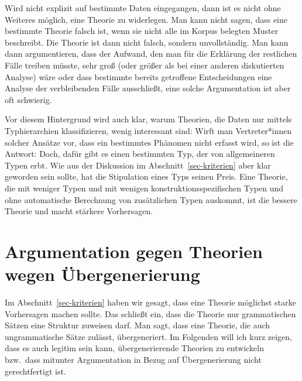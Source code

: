 Wird nicht explizit auf bestimmte Daten eingegangen, dann ist es nicht ohne Weiteres möglich,
eine Theorie zu widerlegen. Man kann \zb nicht sagen, dass eine bestimmte Theorie %
falsch ist, wenn sie nicht alle im Korpus belegten Muster %
beschreibt. Die Theorie ist dann nicht falsch, sondern unvollständig. Man kann dann argumentieren,
dass der Aufwand, den man für die Erklärung der restlichen Fälle treiben müsste, sehr groß (oder größer als bei einer
anderen diskutierten Analyse) wäre oder dass bestimmte bereits getroffene Entscheidungen eine Analyse der verbleibenden Fälle ausschließt,
eine solche Argumentation ist aber oft schwierig. 

Vor diesem Hintergrund wird auch klar, warum Theorien, die Daten nur mittels Typhierarchien klassifizieren,
wenig interessant sind: Wirft man Vertreter*innen solcher Ansätze vor, dass ein bestimmtes Phänomen
nicht erfasst wird, so ist die Antwort: Doch, dafür gibt es einen bestimmten Typ, der von allgemeineren
Typen erbt. Wie aus der Diskussion im Abschnitt~\ref{sec-kriterien} aber klar geworden sein sollte,
hat die Stipulation eines Typs seinen Preis. Eine Theorie, die mit weniger Typen und mit wenigen
konstruktionsspezifischen Typen und ohne automatische Berechnung von zusätzlichen Typen
auskommt, ist die bessere Theorie und macht stärkere Vorhersagen.






\section{Argumentation gegen Theorien wegen Übergenerierung}

Im Abschnitt~\ref{sec-kriterien} haben wir gesagt, dass eine Theorie möglichst starke Vorhersagen
machen sollte. Das schließt ein, dass die Theorie nur grammatischen Sätzen eine Struktur zuweisen
darf. Man sagt, dass eine Theorie, die auch ungrammatische Sätze zulässt, übergeneriert. Im Folgenden
will ich kurz zeigen, dass es auch legitim sein kann, übergenerierende Theorien zu entwickeln bzw.\
dass mitunter Argumentation in Bezug auf Übergenerierung nicht gerechtfertigt ist.

